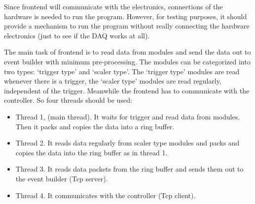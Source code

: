 \documentclass[a4paper,12pt]{article}
\begin{document}
	Since frontend will communicate with the electronics, connections of the
	hardware is needed to run the program. However, for testing purposes, it
	should provide a mechanism to run the program without really connecting
	the hardware electronics (just to see if the DAQ works at all).
	
	The main task of frontend is to read data from modules and send the data
	out to event builder with minimum pre-processing. The modules can be
	categorized into two types: `trigger type' and `scaler type'. The
	`trigger type' modules are read whenever there is a trigger, the `scaler
	type' modules are read regularly, independent of the trigger. Meanwhile
	the frontend has to communicate with the controller. So four threads
	should be used:
	\begin{itemize}
		\item Thread 1, (main thread). It waits for trigger and read data
			from modules. Then it packs and copies the data into a ring
			buffer.
		\item Thread 2. It reads data regularly from scaler type modules and
			packs and copies the data into the ring buffer as in thread 1.
		\item Thread 3. It reads data packets from the ring buffer and sends
			them out to the event builder (Tcp server).
		\item Thread 4. It communicates with the controller (Tcp client).
	\end{itemize}
\end{document}
